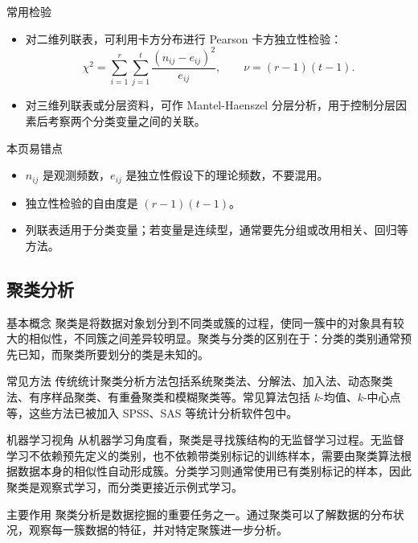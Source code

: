 \documentclass[UTF8,zihao=-4,fontset=fandol]{ctexart}
\begin{document}
\begin{methodbox}{常用检验}
\begin{itemize}
  \item 对二维列联表，可利用卡方分布进行 Pearson 卡方独立性检验：
  \[
  \chi^2=\sum_{i=1}^{r}\sum_{j=1}^{t}
  \frac{(n_{ij}-e_{ij})^2}{e_{ij}},
  \qquad
  \nu=(r-1)(t-1).
  \]
  \item 对三维列联表或分层资料，可作 Mantel-Haenszel 分层分析，用于控制分层因素后考察两个分类变量之间的关联。
\end{itemize}
\end{methodbox}

\begin{warnbox}{本页易错点}
\begin{itemize}
  \item $n_{ij}$ 是观测频数，$e_{ij}$ 是独立性假设下的理论频数，不要混用。
  \item 独立性检验的自由度是 $(r-1)(t-1)$。
  \item 列联表适用于分类变量；若变量是连续型，通常要先分组或改用相关、回归等方法。
\end{itemize}
\end{warnbox}

\subsection{聚类分析}

\begin{keybox}{基本概念}
聚类是将数据对象划分到不同类或簇的过程，使同一簇中的对象具有较大的相似性，不同簇之间差异较明显。聚类与分类的区别在于：分类的类别通常预先已知，而聚类所要划分的类是未知的。
\end{keybox}

\begin{methodbox}{常见方法}
传统统计聚类分析方法包括系统聚类法、分解法、加入法、动态聚类法、有序样品聚类、有重叠聚类和模糊聚类等。常见算法包括 $k$-均值、$k$-中心点等，这些方法已被加入 SPSS、SAS 等统计分析软件包中。
\end{methodbox}

\begin{keybox}{机器学习视角}
从机器学习角度看，聚类是寻找簇结构的无监督学习过程。无监督学习不依赖预先定义的类别，也不依赖带类别标记的训练样本，需要由聚类算法根据数据本身的相似性自动形成簇。分类学习则通常使用已有类别标记的样本，因此聚类是观察式学习，而分类更接近示例式学习。
\end{keybox}

\begin{methodbox}{主要作用}
聚类分析是数据挖掘的重要任务之一。通过聚类可以了解数据的分布状况，观察每一簇数据的特征，并对特定聚簇进一步分析。
\end{methodbox}
\end{document}
